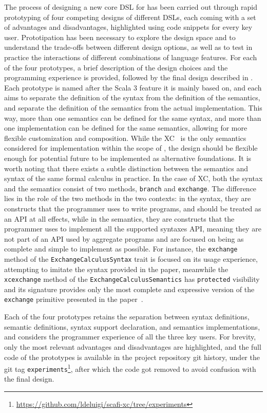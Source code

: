 The process of designing a new core \ac{DSL} for \this has been carried out through rapid prototyping of four competing designs of different \acp{DSL}, each coming with a set of advantages and disadvantages, highlighted using code snippets for every key user.
%
Prototipation has been necessary to explore the design space and to understand the trade-offs between different design options, as well as to test in practice the interactions of different combinations of language features.
%
For each of the four prototypes, a brief description of the design choices and the programming experience is provided, followed by the final design described in .
%
Each prototype is named after the Scala 3 feature it is mainly based on, and each aims to separate the definition of the syntax from the definition of the semantics, and separate the definition of the semantics from the actual implementation.
%
This way, more than one semantics can be defined for the same syntax, and more than one implementation can be defined for the same semantics, allowing for more flexible customization and composition.
%
While the \ac{XC}~\cite{xc} is the only semantics considered for implementation within the scope of \this, the design should be flexible enough for potential future  to be implemented as alternative foundations.
%
It is worth noting that there exists a subtle distinction between the semantics and syntax of the same formal calculus in practice.
%
In the case of \ac{XC}, both the syntax and the semantics consist of two methods, \texttt{branch} and \texttt{exchange}.
%
The difference lies in the role of the two methods in the two contexts: in the syntax, they are constructs that the programmer uses to write programs, and should be treated as an \ac{API} at all effects, while in the semantics, they are constructs that the programmer uses to implement all the supported syntaxes \ac{API}, meaning they are not part of an \ac{API} used by aggregate programs and are focused on being as complete and simple to implement as possible.
%
For instance, the \texttt{exchange} method of the \texttt{ExchangeCalculusSyntax} trait is focused on its usage experience, attempting to imitate the syntax provided in the paper, meanwhile the \texttt{xcexchange} method of the \texttt{ExchangeCalculusSemantics} has \texttt{protected} visibility and its signature provides only the most complete and expressive version of the \texttt{exchange} primitive presented in the paper~\cite{xc}.

Each of the four prototypes retains the separation between syntax definitions, semantic definitions, syntax support declaration, and semantics implementations, and considers the programmer experience of all the three key users.
%
For brevity, only the most relevant advantages and disadvantages are highlighted, and the full code of the prototypes is available in the project repository git history, under the git tag \texttt{experiments}\footnote{\url{https://github.com/ldeluigi/scafi-xc/tree/experiments}}, after which the code got removed to avoid confusion with the final design.


